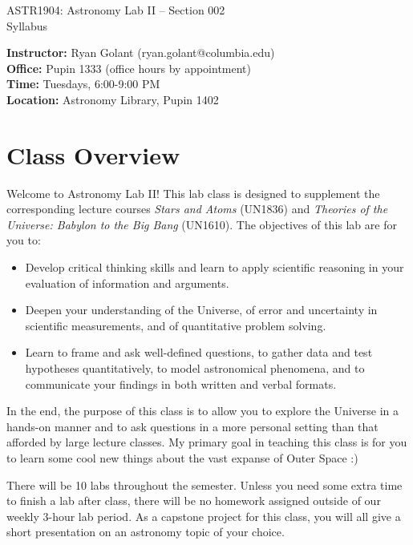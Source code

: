 \documentclass[11pt]{article}
\begin{document}
\begin{center}
\LARGE{ASTR1904: Astronomy Lab II -- Section 002} \\ \medskip \Large{Syllabus}\\ 
\end{center}

\noindent
\textbf{Instructor:} Ryan Golant (ryan.golant@columbia.edu)\\
\textbf{Office:} Pupin 1333 (office hours by appointment)\\ 
\textbf{Time:} {Tuesdays, 6:00-9:00 PM} \\
\textbf{Location:} {Astronomy Library, Pupin 1402} \\

\section*{Class Overview}
Welcome to Astronomy Lab II! This lab class is designed to supplement the corresponding lecture courses \textit{Stars and Atoms} (UN1836) and \textit{Theories of the Universe: Babylon to the Big Bang} (UN1610). The objectives of this lab are for you to:
\begin{itemize}
\item Develop critical thinking skills and learn to apply scientific reasoning in your evaluation of information and arguments. 
\item Deepen your understanding of the Universe, of error and uncertainty in scientific measurements, and of quantitative problem solving.
\item Learn to frame and ask well-defined questions, to gather data and test hypotheses quantitatively, to model astronomical phenomena, and to communicate your findings in both written and verbal formats.
\end{itemize}
In the end, the purpose of this class is to allow you to explore the Universe in a hands-on manner and to ask questions in a more personal setting than that afforded by large lecture classes. My primary goal in teaching this class is for you to learn some cool new things about the vast expanse of Outer Space :) 

\bigskip
 
\noindent There will be 10 labs throughout the semester. Unless you need some extra time to finish a lab after class, there will be no homework assigned outside of our weekly 3-hour lab period. As a capstone project for this class, you will all give a short presentation on an astronomy topic of your choice.
 
\end{document}
